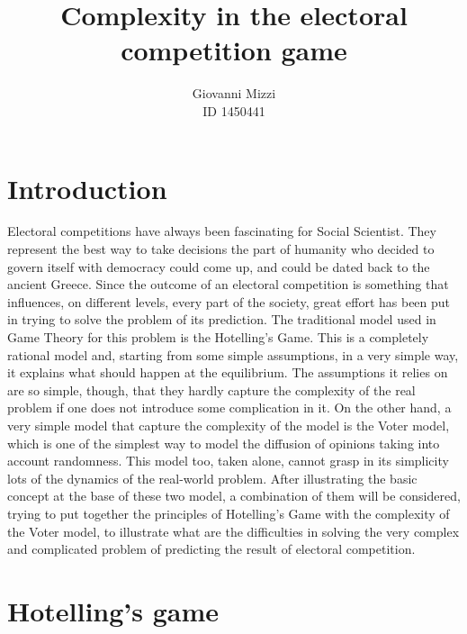 \documentclass[11pt,a4paper,twocolumn]{article}
\author{Giovanni Mizzi \\ID 1450441}
\title{\textbf{Complexity in the electoral competition game}}
\begin{document}
\maketitle

\section*{Introduction}
\vspace*{-0.2cm}
Electoral competitions have always been fascinating for Social Scientist. They represent the best way to take decisions the part of humanity who decided to govern itself with democracy could come up, and could be dated back to the ancient Greece. Since the outcome of an electoral competition is something that influences, on different levels, every part of the society, great effort has been put in trying to solve the problem of its prediction.
The traditional model used in Game Theory for this problem is the Hotelling's Game. This is a completely rational model and, starting from some simple assumptions, in a very simple way, it explains what should happen at the equilibrium. The assumptions it relies on are so simple, though, that they hardly capture the complexity of the real problem if one does not introduce some complication in it.
On the other hand, a very simple model that capture the complexity of the model is the Voter model, which is one of the simplest way to model the diffusion of opinions taking into account randomness. This model too, taken alone, cannot grasp in its simplicity lots of the dynamics of the real-world problem.
After illustrating the basic concept at the base of these two model, a combination of them will be considered, trying to put together the principles of Hotelling's Game with the complexity of the Voter model, to illustrate what are the difficulties in solving the very complex and complicated problem of predicting the result of electoral competition.

\section*{Hotelling's game}
\vspace*{-0.2cm}
\end{document}
